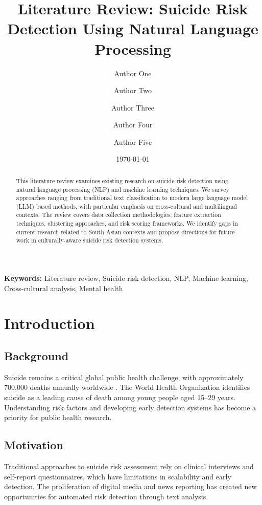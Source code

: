 \documentclass[12pt,a4paper]{article}
\title{\textbf{Literature Review: Suicide Risk Detection Using Natural Language Processing}}
\author[1]{Author One}
\author[1]{Author Two}
\author[1]{Author Three}
\author[1]{Author Four}
\author[1]{Author Five}
\affil[1]{Department of Computer Science, University Name, Bangladesh}
\date{\today}
\begin{document}
\maketitle

\begin{abstract}
This literature review examines existing research on suicide risk detection using natural language processing (NLP) and machine learning techniques. We survey approaches ranging from traditional text classification to modern large language model (LLM) based methods, with particular emphasis on cross-cultural and multilingual contexts. The review covers data collection methodologies, feature extraction techniques, clustering approaches, and risk scoring frameworks. We identify gaps in current research related to South Asian contexts and propose directions for future work in culturally-aware suicide risk detection systems.
\end{abstract}

\vspace{1em}
\noindent\textbf{Keywords:} Literature review, Suicide risk detection, NLP, Machine learning, Cross-cultural analysis, Mental health

\tableofcontents
\newpage

\section{Introduction}

\subsection{Background}
Suicide remains a critical global public health challenge, with approximately 700,000 deaths annually worldwide \cite{who2023}. The World Health Organization identifies suicide as a leading cause of death among young people aged 15--29 years. Understanding risk factors and developing early detection systems has become a priority for public health research.

\subsection{Motivation}
Traditional approaches to suicide risk assessment rely on clinical interviews and self-report questionnaires, which have limitations in scalability and early detection. The proliferation of digital media and news reporting has created new opportunities for automated risk detection through text analysis.
\end{document}
